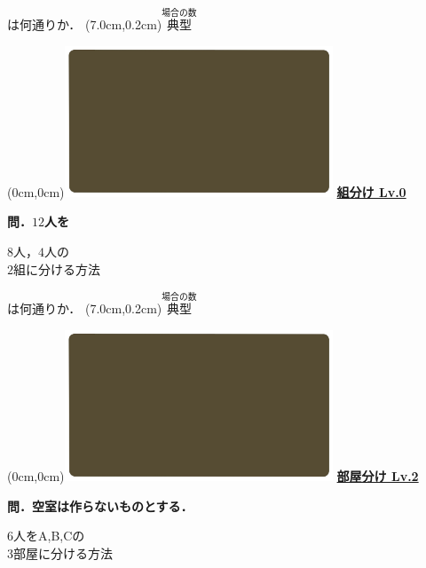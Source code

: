 \documentclass[10pt,
fleqn,
dvipdfmx,
uplatex
]{jsarticle}
\begin{document}
\large
\vspace{0.1zw}
\hfill は何通りか．
\at(7.0cm,0.2cm){\small\color{bradorange}$\overset{\text{場合の数}}{\text{典型}}$}


\newpage



\at(0cm,0cm){\includegraphics[width=8cm,bb=0 0 1920 1080]{./youtube/thumbnails/templates/smart_background/場合の数.jpeg}}
{\color{orange}\bf\boldmath\huge\underline{組分け Lv.0 }}\vspace{0.3zw}

\large 
\bf\boldmath 問．${12}$人を

\Huge
\vspace{-0.3zw}
\hspace{0.1zw} $8$人，$4$人の\vspace{-0.2zw}\\
\hfill $2$組に分ける方法\hspace{0.1zw} 

\large
\vspace{0.1zw}
\hfill は何通りか．
\at(7.0cm,0.2cm){\small\color{bradorange}$\overset{\text{場合の数}}{\text{典型}}$}


\newpage



\at(0cm,0cm){\includegraphics[width=8cm,bb=0 0 1920 1080]{./youtube/thumbnails/templates/smart_background/場合の数.jpeg}}
{\color{orange}\bf\boldmath\huge\underline{部屋分け Lv.2 }}\vspace{0.3zw}


\large 
\bf\boldmath 問．空室は作らないものとする．

\Huge
\vspace{-0.3zw}
\hspace{0.1zw} $6$人をA,\;B,\;Cの\vspace{-0.2zw}\\
\hfill$3$部屋に分ける方法\hspace{0.1zw} 
\end{document}
